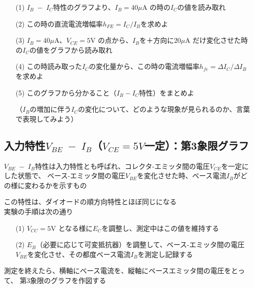 \documentclass[uplatex,a4paper,11pt,oneside,openany]{jsbook}
\begin{document}
\begin{enumerate}
\item[(1)] $I_B\;-\;I_C$特性のグラフより、$I_B=40\mu$A の時の$I_C$の値を読み取れ\\
\item[(2)] この時の直流電流増幅率$h_{FE}=I_C/I_B$を求めよ\\
\item[(3)] $I_B=40\mu$A、$V_{CE}=5$V の点から、$I_B$を＋方向に$20\mu$A だけ変化させた時の$I_C$の値をグラフから読み取れ\\
\item[(4)] この時読み取った$I_C$の変化量から、この時の電流増幅率$h_{fe}=\Delta I_C/\Delta I_B$を求めよ\\
\item[(5)] このグラフから分かること（$I_B-I_C$特性）をまとめよ

（$I_B$の増加に伴う$I_C$の変化について、どのような現象が見られるのか、言葉で表現してみよう）
\end{enumerate}

\newpage

\subsection{入力特性$V_{BE}\;-\;I_B$（$V_{CE}=5V$一定）：第3象限グラフ}

$V_{BE}\;-\;I_B$特性は入力特性とも呼ばれ、コレクタ-エミッタ間の電圧$V_{CE}$を一定にした状態で、
ベース-エミッタ間の電圧$V_{BE}$を変化させた時、ベース電流$I_B$がどの様に変わるかを示すもの

この特性は、ダイオードの順方向特性とほぼ同じになる\\

実験の手順は次の通り

\begin{enumerate}
\item[(1)] $V_{CC}=5$V となる様に$E_C$を調整し、測定中はこの値を維持する
\item[(2)] $E_B$（必要に応じて可変抵抗器）を調整して、ベース-エミッタ間の電圧$V_{BE}$を変化させ、その都度ベース電流$I_B$を測定し記録する
\end{enumerate}

測定を終えたら、横軸にベース電流を、縦軸にベースエミッタ間の電圧をとって、
第3象限のグラフを作図する

\vfill
\end{document}
